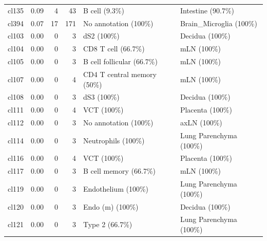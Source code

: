 \begin{table}[ht!]
\begin{tabular}{lrrrll}
  cl135 & 0.09 &   4 &  43 & B cell (9.3\%) & Intestine (90.7\%) \\ 
  cl394 & 0.07 &  17 & 171 & No annotation (100\%) & Brain\_Microglia (100\%) \\ 
  cl103 & 0.00 &   0 &   3 & dS2 (100\%) & Decidua (100\%) \\ 
  cl104 & 0.00 &   0 &   3 & CD8 T cell (66.7\%) & mLN (100\%) \\ 
  cl105 & 0.00 &   0 &   3 & B cell follicular (66.7\%) & mLN (100\%) \\ 
  cl107 & 0.00 &   0 &   4 & CD4 T central memory (50\%) & mLN (100\%) \\ 
  cl108 & 0.00 &   0 &   3 & dS3 (100\%) & Decidua (100\%) \\ 
  cl111 & 0.00 &   0 &   4 & VCT (100\%) & Placenta (100\%) \\ 
  cl112 & 0.00 &   0 &   3 & No annotation (100\%) & axLN (100\%) \\ 
  cl114 & 0.00 &   0 &   3 & Neutrophils (100\%) & Lung Parenchyma (100\%) \\ 
  cl116 & 0.00 &   0 &   4 & VCT (100\%) & Placenta (100\%) \\ 
  cl117 & 0.00 &   0 &   3 & B cell memory (66.7\%) & mLN (100\%) \\ 
  cl119 & 0.00 &   0 &   3 & Endothelium (100\%) & Lung Parenchyma (100\%) \\ 
  cl120 & 0.00 &   0 &   3 & Endo (m) (100\%) & Decidua (100\%) \\ 
  cl121 & 0.00 &   0 &   3 & Type 2 (66.7\%) & Lung Parenchyma (100\%) \\ 
   \bottomrule
\end{tabular}
\end{table}


